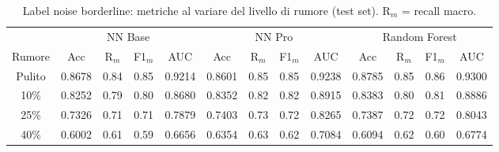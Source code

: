 \begin{table}[H]\centering\footnotesize
\setlength{\tabcolsep}{4pt}
\caption{Label noise borderline: metriche al variare del livello di rumore (test set). R$_m$ = recall macro.}\label{tab:lnb}
\begin{tabular}{c *{12}{c}}
\toprule
 & \multicolumn{4}{c}{NN Base} & \multicolumn{4}{c}{NN Pro} & \multicolumn{4}{c}{Random Forest}\\
\cmidrule(lr){2-5}\cmidrule(lr){6-9}\cmidrule(lr){10-13}
Rumore & Acc & R$_m$ & F1$_m$ & AUC & Acc & R$_m$ & F1$_m$ & AUC & Acc & R$_m$ & F1$_m$ & AUC \\
\midrule
Pulito & 0.8678 & 0.84 & 0.85 & 0.9214 & 0.8601 & 0.85 & 0.85 & 0.9238 & 0.8785 & 0.85 & 0.86 & 0.9300 \\
10\% & 0.8252 & 0.79 & 0.80 & 0.8680 & 0.8352 & 0.82 & 0.82 & 0.8915 & 0.8383 & 0.80 & 0.81 & 0.8886 \\
25\% & 0.7326 & 0.71 & 0.71 & 0.7879 & 0.7403 & 0.73 & 0.72 & 0.8265 & 0.7387 & 0.72 & 0.72 & 0.8043 \\
40\% & 0.6002 & 0.61 & 0.59 & 0.6656 & 0.6354 & 0.63 & 0.62 & 0.7084 & 0.6094 & 0.62 & 0.60 & 0.6774 \\
\bottomrule
\end{tabular}
\end{table}
